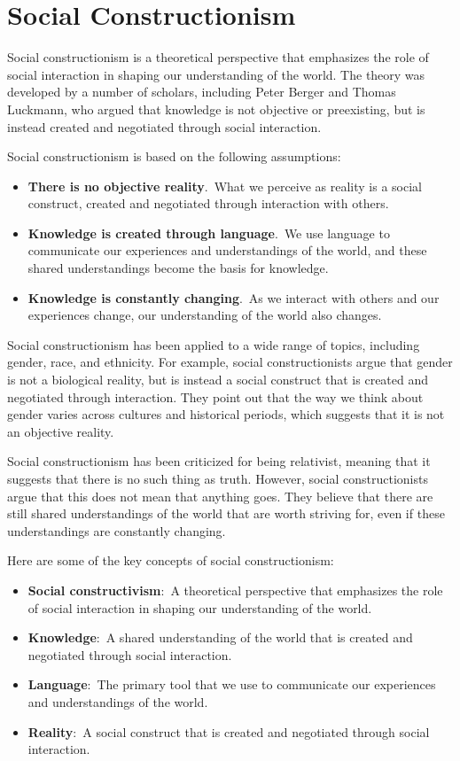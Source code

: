 \documentclass[
  b5paper]{book}
\begin{document}
\hypertarget{social-constructionism}{%
\section{Social Constructionism}\label{social-constructionism}}

Social constructionism is a theoretical perspective that emphasizes the role of social interaction in shaping our understanding of the world. The theory was developed by a number of scholars, including Peter Berger and Thomas Luckmann, who argued that knowledge is not objective or preexisting, but is instead created and negotiated through social interaction.

Social constructionism is based on the following assumptions:

\begin{itemize}
\item
  \textbf{There is no objective reality}.~What we perceive as reality is a social construct, created and negotiated through interaction with others.
\item
  \textbf{Knowledge is created through language}.~We use language to communicate our experiences and understandings of the world, and these shared understandings become the basis for knowledge.
\item
  \textbf{Knowledge is constantly changing}.~As we interact with others and our experiences change, our understanding of the world also changes.
\end{itemize}

Social constructionism has been applied to a wide range of topics, including gender, race, and ethnicity. For example, social constructionists argue that gender is not a biological reality, but is instead a social construct that is created and negotiated through interaction. They point out that the way we think about gender varies across cultures and historical periods, which suggests that it is not an objective reality.

Social constructionism has been criticized for being relativist, meaning that it suggests that there is no such thing as truth. However, social constructionists argue that this does not mean that anything goes. They believe that there are still shared understandings of the world that are worth striving for, even if these understandings are constantly changing.

Here are some of the key concepts of social constructionism:

\begin{itemize}
\item
  \textbf{Social constructivism}:~A theoretical perspective that emphasizes the role of social interaction in shaping our understanding of the world.
\item
  \textbf{Knowledge}:~A shared understanding of the world that is created and negotiated through social interaction.
\item
  \textbf{Language}:~The primary tool that we use to communicate our experiences and understandings of the world.
\item
  \textbf{Reality}:~A social construct that is created and negotiated through social interaction.
\end{itemize}
\end{document}
